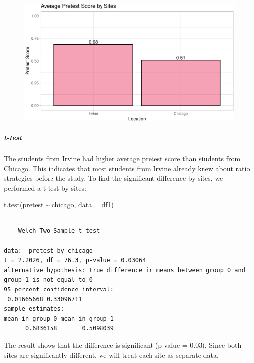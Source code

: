 \documentclass[
  letterpaper,
  DIV=11,
  numbers=noendperiod]{scrartcl}
\let\oldsubparagraph\subparagraph
\renewcommand{\subparagraph}[1]{\oldsubparagraph{#1}\mbox{}}
\newenvironment{Shaded}{\begin{snugshade}}{\end{snugshade}}
\newcommand{\AttributeTok}[1]{\textcolor[rgb]{0.49,0.56,0.16}{#1}}
\newcommand{\FunctionTok}[1]{\textcolor[rgb]{0.02,0.16,0.49}{#1}}
\newcommand{\NormalTok}[1]{\textcolor[rgb]{0.00,0.44,0.13}{#1}}
\newcommand{\SpecialCharTok}[1]{\textcolor[rgb]{0.25,0.44,0.63}{#1}}
\begin{document}
\begin{figure}[H]

{\centering \includegraphics{sampling_files/figure-pdf/unnamed-chunk-11-1.pdf}

}

\end{figure}

\hypertarget{t-test}{%
\subparagraph{t-test}\label{t-test}}

The students from Irvine had higher average pretest score than students
from Chicago. This indicates that most students from Irvine already knew
about ratio strategies before the study. To find the significant
difference by sites, we performed a t-test by sites:

\begin{Shaded}
\begin{Highlighting}[]
\FunctionTok{t.test}\NormalTok{(pretest }\SpecialCharTok{\textasciitilde{}}\NormalTok{ chicago, }\AttributeTok{data =}\NormalTok{ df1)}
\end{Highlighting}
\end{Shaded}

\begin{verbatim}

    Welch Two Sample t-test

data:  pretest by chicago
t = 2.2026, df = 76.3, p-value = 0.03064
alternative hypothesis: true difference in means between group 0 and group 1 is not equal to 0
95 percent confidence interval:
 0.01665668 0.33096711
sample estimates:
mean in group 0 mean in group 1 
      0.6836158       0.5098039 
\end{verbatim}

The result shows that the difference is significant (p-value = 0.03).
Since both sites are significantly different, we will treat each site as
separate data.
\end{document}
